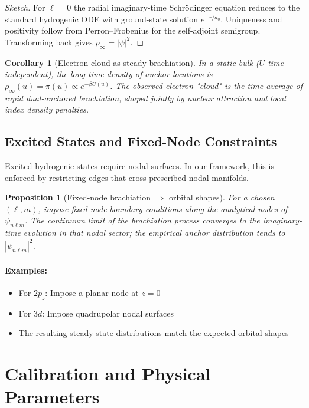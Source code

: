 \documentclass[11pt]{article}
\theoremstyle{plain}
\newtheorem{proposition}[theorem]{Proposition}
\newtheorem{corollary}[theorem]{Corollary}
\theoremstyle{definition}
\begin{document}
\begin{proof}[Sketch]
  For $\ell=0$ the radial imaginary-time Schrödinger equation reduces to the standard hydrogenic ODE with ground-state solution $e^{-r/a_0}$. Uniqueness and positivity follow from Perron–Frobenius for the self-adjoint semigroup. Transforming back gives $\rho_\infty=|\psi|^2$.
\end{proof}

\begin{corollary}[Electron cloud as steady brachiation]
  In a static bulk ($U$ time-independent), the long-time density of anchor locations is $\rho_\infty(u)=\pi(u)\propto e^{-\beta U(u)}$. The observed electron "cloud" is the time-average of rapid dual-anchored brachiation, shaped jointly by nuclear attraction and local index density penalties.
\end{corollary}

\subsection{Excited States and Fixed-Node Constraints}

Excited hydrogenic states require nodal surfaces. In our framework, this is enforced by restricting edges that cross prescribed nodal manifolds.

\begin{proposition}[Fixed-node brachiation $\Rightarrow$ orbital shapes]
  \label{prop:fixed-node}
  For a chosen $(\ell,m)$, impose fixed-node boundary conditions along the analytical nodes of $\psi_{n\ell m}$. The continuum limit of the brachiation process converges to the imaginary-time evolution in that nodal sector; the empirical anchor distribution tends to $|\psi_{n\ell m}|^2$.
\end{proposition}

\paragraph{Examples:}
\begin{itemize}
  \item For $2p_z$: Impose a planar node at $z=0$
  \item For $3d$: Impose quadrupolar nodal surfaces
  \item The resulting steady-state distributions match the expected orbital shapes
\end{itemize}

\section{Calibration and Physical Parameters}
\label{sec:calibration}
\end{document}
